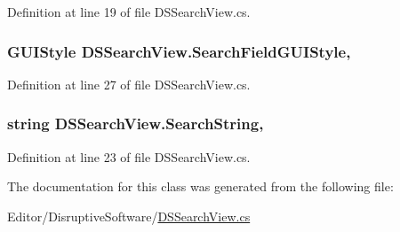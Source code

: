 Definition at line 19 of file D\+S\+Search\+View.\+cs.

\hypertarget{class_d_s_search_view_a1a0977f8cc9bbc9df698c386ab7f9677}{
\subsubsection[{Search\+Field\+G\+U\+I\+Style}]{\setlength{\rightskip}{0pt plus 5cm}G\+U\+I\+Style D\+S\+Search\+View.\+Search\+Field\+G\+U\+I\+Style\hspace{0.3cm}{\ttfamily [get]}, {\ttfamily [set]}}}\label{class_d_s_search_view_a1a0977f8cc9bbc9df698c386ab7f9677}


Definition at line 27 of file D\+S\+Search\+View.\+cs.

\hypertarget{class_d_s_search_view_a0a3cd64a2fcd15014cc12446e908e808}{
\subsubsection[{Search\+String}]{\setlength{\rightskip}{0pt plus 5cm}string D\+S\+Search\+View.\+Search\+String\hspace{0.3cm}{\ttfamily [get]}, {\ttfamily [set]}}}\label{class_d_s_search_view_a0a3cd64a2fcd15014cc12446e908e808}


Definition at line 23 of file D\+S\+Search\+View.\+cs.



The documentation for this class was generated from the following file\+:\begin{DoxyCompactItemize}
\item 
Editor/\+Disruptive\+Software/\hyperlink{_d_s_search_view_8cs}{D\+S\+Search\+View.\+cs}\end{DoxyCompactItemize}
